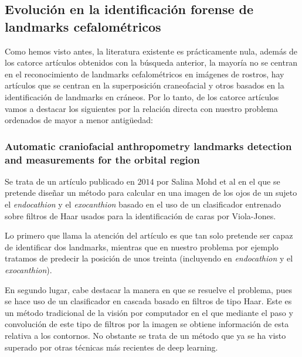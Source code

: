         

        \subsection{Evolución en la identificación forense de landmarks cefalométricos}
            
            \noindent Como hemos visto antes, la literatura existente es prácticamente nula, además de los catorce artículos obtenidos con la búsqueda anterior, la mayoría no se centran en el reconocimiento de landmarks cefalométricos en imágenes de rostros, hay artículos que se centran en la superposición craneofacial y otros basados en la identificación de landmarks en cráneos. Por lo tanto, de los catorce artículos vamos a destacar los siguientes por la relación directa con nuestro problema ordenados de mayor a menor antigüedad: 

            \subsubsection{Automatic craniofacial anthropometry landmarks detection and measurements for the orbital region}
                \noindent Se trata de un artículo publicado en $2014$ por Salina Mohd et al \cite{asi2014automatic} en el que se pretende diseñar un método para calcular en una imagen de los ojos de un sujeto el \textit{endocathion} y el \textit{exocanthion} basado en el uso de un clasificador entrenado sobre filtros de Haar usados para la identificación de caras por Viola-Jones.

                \medskip

                \noindent Lo primero que llama la atención del artículo es que tan solo pretende ser capaz de identificar dos landmarks, mientras que en nuestro problema por ejemplo tratamos de predecir la posición de unos treinta (incluyendo en \textit{endocathion} y el \textit{exocanthion}).

                \medskip

                \noindent En segundo lugar, cabe destacar la manera en que se resuelve el problema, pues se hace uso de un clasificador en cascada basado en filtros de tipo Haar. Este es un método tradicional de la visión por computador en el que mediante el paso y convolución de este tipo de filtros por la imagen se obtiene información de esta relativa a los contornos. No obstante se trata de un método que ya se ha visto superado por otras técnicas más recientes de deep learning.

